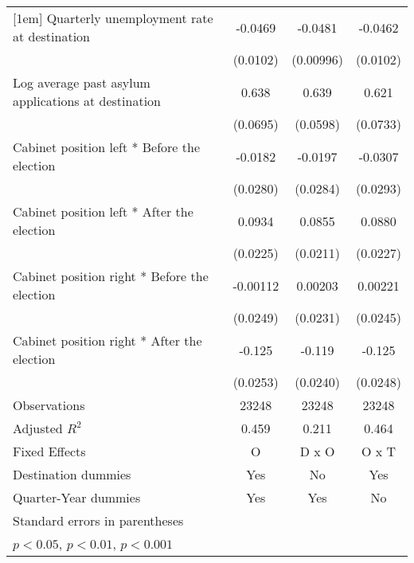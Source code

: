 \begin{table}[htbp]
\begin{tabular}{l*{3}{c}}
[1em]
Quarterly unemployment rate at destination&     -0.0469\sym{***}&     -0.0481\sym{***}&     -0.0462\sym{***}\\
                    &    (0.0102)         &   (0.00996)         &    (0.0102)         \\
[1em]
Log average past asylum applications at destination&       0.638\sym{***}&       0.639\sym{***}&       0.621\sym{***}\\
                    &    (0.0695)         &    (0.0598)         &    (0.0733)         \\
[1em]
Cabinet position left * Before the election&     -0.0182         &     -0.0197         &     -0.0307         \\
                    &    (0.0280)         &    (0.0284)         &    (0.0293)         \\
[1em]
Cabinet position left * After the election&      0.0934\sym{***}&      0.0855\sym{***}&      0.0880\sym{***}\\
                    &    (0.0225)         &    (0.0211)         &    (0.0227)         \\
[1em]
Cabinet position right * Before the election&    -0.00112         &     0.00203         &     0.00221         \\
                    &    (0.0249)         &    (0.0231)         &    (0.0245)         \\
[1em]
Cabinet position right * After the election&      -0.125\sym{***}&      -0.119\sym{***}&      -0.125\sym{***}\\
                    &    (0.0253)         &    (0.0240)         &    (0.0248)         \\
\hline
Observations        &       23248         &       23248         &       23248         \\
Adjusted \(R^{2}\)  &       0.459         &       0.211         &       0.464         \\
Fixed Effects       &           O         &       D x O         &       O x T         \\
Destination dummies &         Yes         &          No         &         Yes         \\
Quarter-Year dummies&         Yes         &         Yes         &          No         \\
\hline\hline
\multicolumn{4}{l}{\footnotesize Standard errors in parentheses}\\
\multicolumn{4}{l}{\footnotesize \sym{*} \(p<0.05\), \sym{**} \(p<0.01\), \sym{***} \(p<0.001\)}\\
\end{tabular}
\end{table}
